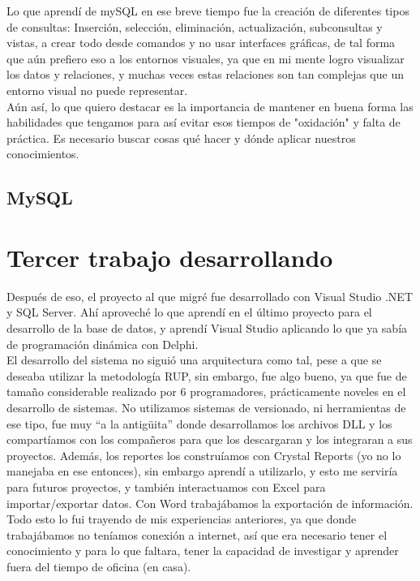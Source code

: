 \documentclass[12pt,spanish,lettersize]{book}
\begin{document}
Lo que aprendí de mySQL en ese breve tiempo fue la creación de diferentes tipos de consultas: Inserción, selección, eliminación, actualización, subconsultas y vistas, a crear todo desde comandos y no usar interfaces gráficas, de tal forma que aún prefiero eso a los entornos visuales, ya que en mi mente logro visualizar los datos y relaciones, y muchas veces estas relaciones son tan complejas que un entorno visual no puede representar.\\

Aún así, lo que quiero destacar es la importancia de mantener en buena forma las habilidades que tengamos para así evitar esos tiempos de "oxidación" y falta de práctica. Es necesario buscar cosas qué hacer y dónde aplicar nuestros conocimientos.\\
\subsection{MySQL}
\section{Tercer trabajo desarrollando}

Después de eso, el proyecto al que migré fue desarrollado con Visual Studio .NET y SQL Server. Ahí aproveché lo que aprendí en el último proyecto para el desarrollo de la base de datos, y aprendí Visual Studio aplicando lo que ya sabía de programación dinámica con Delphi.\\

El desarrollo del sistema no siguió una arquitectura como tal, pese a que se deseaba utilizar la metodología RUP, sin embargo, fue algo bueno, ya que fue de tamaño considerable realizado por 6 programadores, prácticamente noveles en el desarrollo de sistemas. No utilizamos sistemas de versionado, ni herramientas de ese tipo, fue muy “a la antigüita” donde desarrollamos los archivos DLL y los compartíamos con los compañeros para que los descargaran y los integraran a sus proyectos. Además, los reportes los construíamos con Crystal Reports (yo no lo manejaba en ese entonces), sin embargo aprendí a utilizarlo, y esto me serviría para futuros proyectos, y también interactuamos con Excel para importar/exportar datos. Con Word trabajábamos la exportación de información. Todo esto lo fui trayendo de mis experiencias anteriores, ya que donde trabajábamos no teníamos conexión a internet, así que era necesario tener el conocimiento y para lo que faltara, tener la capacidad de investigar y aprender fuera del tiempo de oficina (en casa).\\
\end{document}
